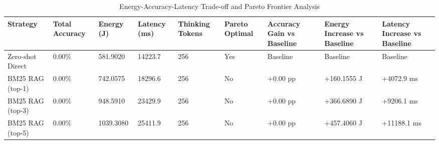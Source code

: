 \begin{table}
\caption{Energy-Accuracy-Latency Trade-off and Pareto Frontier Analysis}
\label{tab:tradeoff_comparison}
\begin{tabular}{lllllllll}
\toprule
Strategy & Total Accuracy & Energy (J) & Latency (ms) & Thinking Tokens & Pareto Optimal & Accuracy Gain vs Baseline & Energy Increase vs Baseline & Latency Increase vs Baseline \\
\midrule
Zero-shot Direct & 0.00\% & 581.9020 & 14223.7 & 256 & Yes & Baseline & Baseline & Baseline \\
BM25 RAG (top-1) & 0.00\% & 742.0575 & 18296.6 & 256 & No & +0.00 pp & +160.1555 J & +4072.9 ms \\
BM25 RAG (top-3) & 0.00\% & 948.5910 & 23429.9 & 256 & No & +0.00 pp & +366.6890 J & +9206.1 ms \\
BM25 RAG (top-5) & 0.00\% & 1039.3080 & 25411.9 & 256 & No & +0.00 pp & +457.4060 J & +11188.1 ms \\
\bottomrule
\end{tabular}
\end{table}
